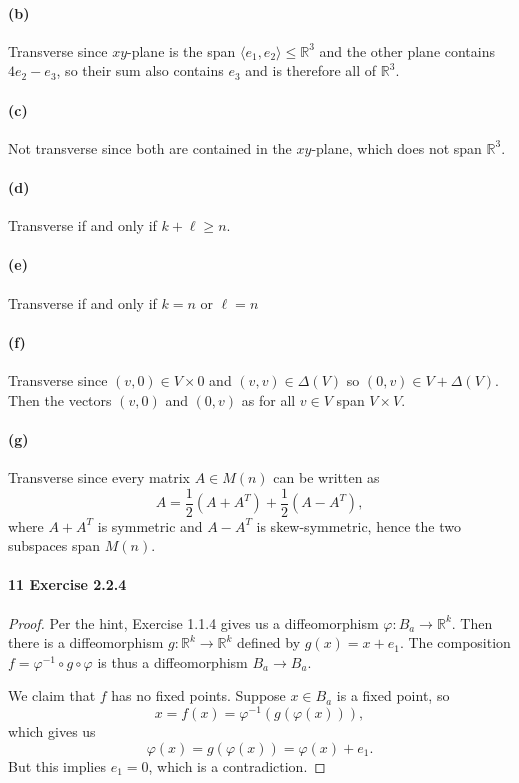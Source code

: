 \documentclass[12pt]{article}
\newlength{\myparskip}
\newenvironment{fullbox}{\begin{lrbox}{\savefullbox}\begin{minipage}{\dimexpr\textwidth-2\fboxsep\relax}\setlength{\parskip}{\myparskip}}{\end{minipage}\end{lrbox}\framebox[\textwidth]{\usebox{\savefullbox}}}
\newenvironment{pbox}[1][]{\begin{fullbox}\def\temp{#1}\ifx\temp\empty\else\paragraph{#1}\phantom{}\fi}{\end{fullbox}}
\theoremstyle{definition}
\newcommand{\R}{\mathbb{R}}
\renewcommand{\phi}{\varphi}
\newcommand{\<}{\langle}
\renewcommand{\>}{\rangle}
\begin{document}
\begin{pbox}[(b)]
\end{pbox}

Transverse since $xy$-plane is the span $\<e_1, e_2\> \leq \R^3$ and the other plane contains $4e_2 - e_3$, so their sum also contains $e_3$ and is therefore all of $\R^3$.

\begin{pbox}[(c)]
\end{pbox}

Not transverse since both are contained in the $xy$-plane, which does not span $\R^3$.


\begin{pbox}[(d)]
\end{pbox}

Transverse if and only if $k + \ell \geq n$.

\begin{pbox}[(e)]
\end{pbox}

Transverse if and only if $k = n$ or $\ell = n$

\begin{pbox}[(f)]
\end{pbox}

Transverse since $(v, 0) \in V \times 0$ and $(v, v) \in \Delta(V)$ so $(0, v) \in V + \Delta(V)$.
Then the vectors $(v, 0)$ and $(0, v)$ as for all $v \in V$ span $V \times V$.

\begin{pbox}[(g)]
\end{pbox}

Transverse since every matrix $A \in M(n)$ can be written as
\[
    A = \frac{1}{2}(A + A^T) + \frac{1}{2}(A - A^T),
\]
where $A + A^T$ is symmetric and $A - A^T$ is skew-symmetric, hence the two subspaces span $M(n)$.

\begin{pbox}[11 Exercise 2.2.4]
\end{pbox}

\begin{proof}
    Per the hint, Exercise 1.1.4 gives us a diffeomorphism $\phi : B_a \to \R^k$.
    Then there is a diffeomorphism $g : \R^k \to \R^k$ defined by $g(x) = x + e_1$.
    The composition $f = \phi^{-1} \circ g \circ \phi$ is thus a diffeomorphism $B_a \to B_a$.

    We claim that $f$ has no fixed points.
    Suppose $x \in B_a$ is a fixed point, so
    \[
        x = f(x) = \phi^{-1}(g(\phi(x))),
    \]
    which gives us
    \[
        \phi(x) = g(\phi(x)) = \phi(x) + e_1.
    \]
    But this implies $e_1 = 0$, which is a contradiction.
\end{proof}
\end{document}
